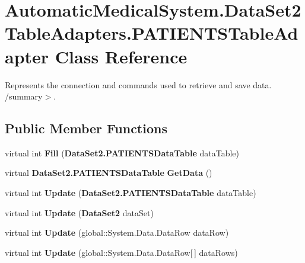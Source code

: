 \section{AutomaticMedicalSystem.DataSet2TableAdapters.PATIENTSTableAdapter Class Reference}
\label{class_automatic_medical_system_1_1_data_set2_table_adapters_1_1_p_a_t_i_e_n_t_s_table_adapter}
Represents the connection and commands used to retrieve and save data. /summary$>$.  


\subsection*{Public Member Functions}
\begin{CompactItemize}
\item 
virtual int \textbf{Fill} ({\bf DataSet2.PATIENTSDataTable} dataTable)\label{class_automatic_medical_system_1_1_data_set2_table_adapters_1_1_p_a_t_i_e_n_t_s_table_adapter_5cd553968ba70ec1799fdc13dd94e588}

\item 
virtual {\bf DataSet2.PATIENTSDataTable} \textbf{GetData} ()\label{class_automatic_medical_system_1_1_data_set2_table_adapters_1_1_p_a_t_i_e_n_t_s_table_adapter_549e663e0a3ea0a2825b4cb18e851235}

\item 
virtual int \textbf{Update} ({\bf DataSet2.PATIENTSDataTable} dataTable)\label{class_automatic_medical_system_1_1_data_set2_table_adapters_1_1_p_a_t_i_e_n_t_s_table_adapter_4e93d363dd8edb6277b3cf6fae8b5fd1}

\item 
virtual int \textbf{Update} ({\bf DataSet2} dataSet)\label{class_automatic_medical_system_1_1_data_set2_table_adapters_1_1_p_a_t_i_e_n_t_s_table_adapter_483a4cb998c1b4c2ddb671dd397d00b4}

\item 
virtual int \textbf{Update} (global::System.Data.DataRow dataRow)\label{class_automatic_medical_system_1_1_data_set2_table_adapters_1_1_p_a_t_i_e_n_t_s_table_adapter_38411fe167cec28aa8fc6aa9fb425aff}

\item 
virtual int \textbf{Update} (global::System.Data.DataRow[$\,$] dataRows)\label{class_automatic_medical_system_1_1_data_set2_table_adapters_1_1_p_a_t_i_e_n_t_s_table_adapter_019193aed7976dcf9d4ebb44190963f0}


\end{CompactItemize}
